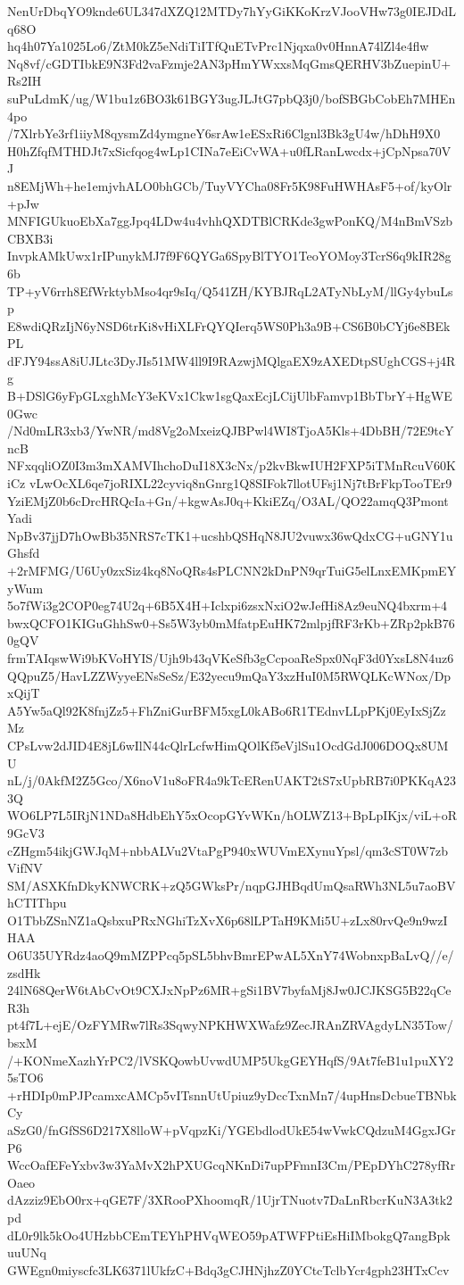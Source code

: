 NenUrDbqYO9knde6UL347dXZQ12MTDy7hYyGiKKoKrzVJooVHw73g0IEJDdLq68O
hq4h07Ya1025Lo6/ZtM0kZ5eNdiTiITfQuETvPrc1Njqxa0v0HnnA74lZl4e4flw
Nq8vf/cGDTIbkE9N3Fd2vaFzmje2AN3pHmYWxxsMqGmsQERHV3bZuepinU+Rs2IH
suPuLdmK/ug/W1bu1z6BO3k61BGY3ugJLJtG7pbQ3j0/bofSBGbCobEh7MHEn4po
/7XlrbYe3rf1iiyM8qysmZd4ymgneY6srAw1eESxRi6Clgnl3Bk3gU4w/hDhH9X0
H0hZfqfMTHDJt7xSicfqog4wLp1CINa7eEiCvWA+u0fLRanLwcdx+jCpNpsa70VJ
n8EMjWh+he1emjvhALO0bhGCb/TuyVYCha08Fr5K98FuHWHAsF5+of/kyOlr+pJw
MNFIGUkuoEbXa7ggJpq4LDw4u4vhhQXDTBlCRKde3gwPonKQ/M4nBmVSzbCBXB3i
InvpkAMkUwx1rIPunykMJ7f9F6QYGa6SpyBlTYO1TeoYOMoy3TcrS6q9kIR28g6b
TP+yV6rrh8EfWrktybMso4qr9sIq/Q541ZH/KYBJRqL2ATyNbLyM/llGy4ybuLsp
E8wdiQRzIjN6yNSD6trKi8vHiXLFrQYQIerq5WS0Ph3a9B+CS6B0bCYj6e8BEkPL
dFJY94ssA8iUJLtc3DyJIs51MW4ll9I9RAzwjMQlgaEX9zAXEDtpSUghCGS+j4Rg
B+DSlG6yFpGLxghMcY3eKVx1Ckw1sgQaxEcjLCijUlbFamvp1BbTbrY+HgWE0Gwc
/Nd0mLR3xb3/YwNR/md8Vg2oMxeizQJBPwl4WI8TjoA5Kls+4DbBH/72E9tcYncB
NFxqqliOZ0I3m3mXAMVIhchoDuI18X3cNx/p2kvBkwIUH2FXP5iTMnRcuV60KiCz
vLwOcXL6qe7joRIXL22cyviq8nGnrg1Q8SIFok7llotUFsj1Nj7tBrFkpTooTEr9
YziEMjZ0b6cDrcHRQcIa+Gn/+kgwAsJ0q+KkiEZq/O3AL/QO22amqQ3PmontYadi
NpBv37jjD7hOwBb35NRS7cTK1+ucshbQSHqN8JU2vuwx36wQdxCG+uGNY1uGhsfd
+2rMFMG/U6Uy0zxSiz4kq8NoQRs4sPLCNN2kDnPN9qrTuiG5elLnxEMKpmEYyWum
5o7fWi3g2COP0eg74U2q+6B5X4H+Iclxpi6zsxNxiO2wJefHi8Az9euNQ4bxrm+4
bwxQCFO1KIGuGhhSw0+Ss5W3yb0mMfatpEuHK72mlpjfRF3rKb+ZRp2pkB760gQV
frmTAIqswWi9bKVoHYIS/Ujh9b43qVKeSfb3gCcpoaReSpx0NqF3d0YxsL8N4uz6
QQpuZ5/HavLZZWyyeENsSeSz/E32yecu9mQaY3xzHuI0M5RWQLKcWNox/DpxQijT
A5Yw5aQl92K8fnjZz5+FhZniGurBFM5xgL0kABo6R1TEdnvLLpPKj0EyIxSjZzMz
CPsLvw2dJID4E8jL6wIlN44cQlrLcfwHimQOlKf5eVjlSu1OcdGdJ006DOQx8UMU
nL/j/0AkfM2Z5Gco/X6noV1u8oFR4a9kTcERenUAKT2tS7xUpbRB7i0PKKqA233Q
WO6LP7L5IRjN1NDa8HdbEhY5xOcopGYvWKn/hOLWZ13+BpLpIKjx/viL+oR9GcV3
cZHgm54ikjGWJqM+nbbALVu2VtaPgP940xWUVmEXynuYpsl/qm3cST0W7zbVifNV
SM/ASXKfnDkyKNWCRK+zQ5GWksPr/nqpGJHBqdUmQsaRWh3NL5u7aoBVhCTIThpu
O1TbbZSnNZ1aQsbxuPRxNGhiTzXvX6p68lLPTaH9KMi5U+zLx80rvQe9n9wzIHAA
O6U35UYRdz4aoQ9mMZPPcq5pSL5bhvBmrEPwAL5XnY74WobnxpBaLvQ//e/zsdHk
24lN68QerW6tAbCvOt9CXJxNpPz6MR+gSi1BV7byfaMj8Jw0JCJKSG5B22qCeR3h
pt4f7L+ejE/OzFYMRw7lRs3SqwyNPKHWXWafz9ZecJRAnZRVAgdyLN35Tow/bsxM
/+KONmeXazhYrPC2/lVSKQowbUvwdUMP5UkgGEYHqfS/9At7feB1u1puXY25sTO6
+rHDIp0mPJPcamxcAMCp5vITsnnUtUpiuz9yDccTxnMn7/4upHnsDcbueTBNbkCy
aSzG0/fnGfSS6D217X8lloW+pVqpzKi/YGEbdlodUkE54wVwkCQdzuM4GgxJGrP6
WccOafEFeYxbv3w3YaMvX2hPXUGcqNKnDi7upPFmnI3Cm/PEpDYhC278yfRrOaeo
dAzziz9EbO0rx+qGE7F/3XRooPXhoomqR/1UjrTNuotv7DaLnRbcrKuN3A3tk2pd
dL0r9lk5kOo4UHzbbCEmTEYhPHVqWEO59pATWFPtiEsHiIMbokgQ7angBpkuuUNq
GWEgn0miyscfc3LK6371lUkfzC+Bdq3gCJHNjhzZ0YCtcTclbYcr4gph23HTxCcv
